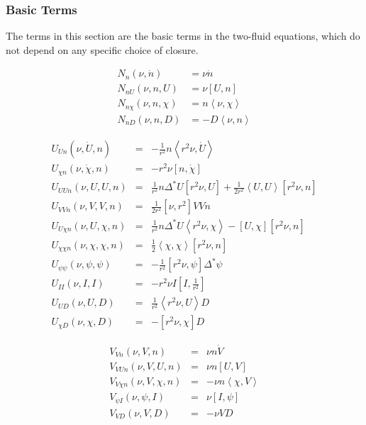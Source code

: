\documentclass[letterpaper]{book}
\newcommand{\gs}[1]{\Delta^* #1}
\newcommand{\pb}[2]{\left[#1,#2\right]}
\newcommand{\ip}[2]{\left\langle  #1,#2\right\rangle}
\begin{document}
\subsubsection{Basic Terms}

The terms in this section are the basic terms in the two-fluid
equations, which do not depend on any specific choice of closure.

\begin{equation}
  \begin{array}{ll}
  N_n(\nu, \dot{n}) & = \nu \dot{n}\\
  N_{n U}(\nu, n, U) & = \nu \pb{U}{n}\\
  N_{n \chi}(\nu, n, \chi) & = n \ip{\nu}{\chi}\\
  N_{n D}(\nu, n, D) & = - D \ip{\nu}{n}
  \end{array}
\end{equation}

\begin{equation}
  \begin{array}{lcl}
    U_{U n}(\nu, \dot U, n) & = & -\frac{1}{r^2} n \ip{r^2 \nu}{\dot{U}}
    \\
    U_{\chi n}(\nu, \dot \chi, n) & = & -r^2 \nu \pb{n}{\dot{\chi}}
    \\
    U_{U U n}(\nu, U, U, n) & = & \frac{1}{r^2} n \gs{U} \pb{r^2\nu}{U}
      + \frac{1}{2 r^2} \ip{U}{U}\pb{r^2\nu}{n}
    \\
    U_{V V n}(\nu, V,  V, n) & = &  \frac{1}{2 r^2} \pb{\nu}{r^2} V V n
    \\
    U_{U \chi n}(\nu, U, \chi, n) & = & 
      \frac{1}{r^2}n \gs{U}\ip{r^2\nu}{\chi} 
      - \pb{U}{\chi} \pb{r^2\nu}{n}
    \\
    U_{\chi \chi n}(\nu, \chi, \chi, n) & = &
      \frac{1}{2} \ip{\chi}{\chi} \pb{r^2 \nu}{n}
    \\
    U_{\psi \psi}(\nu, \psi, \psi) & = &
      -\frac{1}{r^2} \pb{r^2 \nu}{\psi} \gs{\psi}
    \\
    U_{I I}(\nu, I, I) & = & -r^2 \nu I \pb{I}{\frac{1}{r^2}}
    \\
    U_{U D}(\nu, U, D) & = & \frac{1}{r^2} \ip{r^2 \nu}{U} D
    \\
    U_{\chi D}(\nu, \chi, D) & = & -\pb{r^2 \nu}{\chi} D
  \end{array}
\end{equation}

\begin{equation}
  \begin{array}{lcl}
    V_{V n}(\nu, V, n) & = & \nu n \dot{V}\\
    V_{V U n}(\nu, V, U, n) & = & \nu n \pb{U}{V}\\
    V_{V \chi n}(\nu, V, \chi, n) & = & -\nu n \ip{\chi}{V}\\
    V_{\psi I}(\nu, \psi, I) & = & \nu \pb{I}{\psi}\\
    V_{V D}(\nu, V, D) & = & -\nu V D
  \end{array}
\end{equation}    
\end{document}
